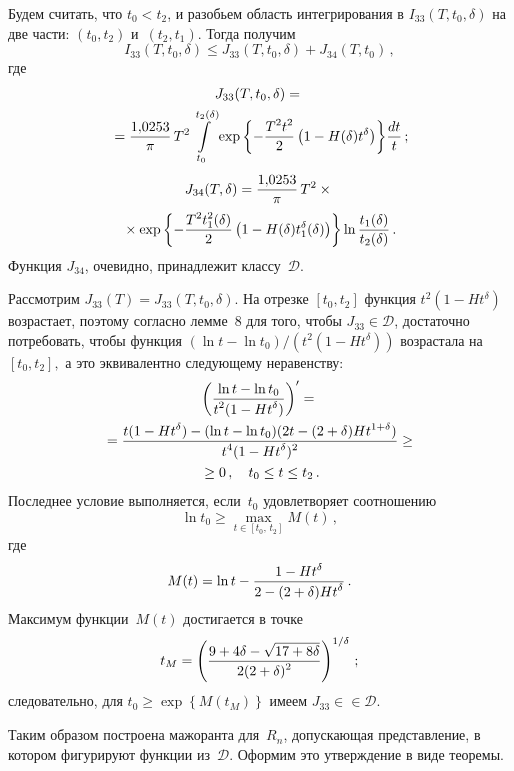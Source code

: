\begin{multicols}{2}
Будем считать, что $t_0<t_2$, и разобьем область интегрирования в
$I_{33}(T,t_0,\delta)$ на две части: $(t_0,t_2)$ и~$(t_2,t_1)$. Тогда
получим
$$
I_{33}(T,t_0,\delta)\le J_{33}(T,t_0,\delta)+J_{34}(T,t_0)\,,
$$
где
\begin{multline*}
J_{33}(T,t_0,\delta)={}\\
{}=
 \displaystyle\frac{\displaystyle 1{,}0253\mathstrut}{\displaystyle \pi\mathstrut}\,T^2\int\limits_{t_0}^{t_2(\delta)}
{\exp\left\{-\displaystyle\frac{\displaystyle T^2t^2\mathstrut}{\displaystyle 2\mathstrut}\left(1-H(\delta)t^{\delta}\right)\right\}}
\displaystyle\frac{\displaystyle dt\mathstrut}{\displaystyle t\mathstrut}\,;
\end{multline*}
\begin{multline*}
J_{34}(T,\delta)= \displaystyle\frac{\displaystyle 1{,}0253\mathstrut}{\displaystyle \pi\mathstrut}\,T^2\times{}\\
{}\times
\exp\left\{-\displaystyle\frac{\displaystyle T^2t_1^2(\delta)\mathstrut}{\displaystyle 2\mathstrut}\left(1-H(\delta)t_1^{\delta}(\delta)\right)
\right\} \ln\displaystyle\frac{\displaystyle t_1(\delta)\mathstrut}{\displaystyle t_2(\delta)\mathstrut}\,.
\end{multline*}
Функция $J_{34}$, очевидно, принадлежит классу~$\mathcal D$.
\pagebreak

Рассмотрим $J_{33}(T)=J_{33}(T,t_0,\delta)$. На отрезке $[t_0,t_2]$
функция $t^2(1-Ht^{\delta})$ возрастает, поэтому согласно
лемме~8 для того, чтобы $J_{33}\in \mathcal D$,
достаточно потребовать, чтобы функция
$\left(\ln t-\ln t_0\right)\!/\!\left(t^2(1-Ht^{\delta})\right)$
возрастала на $[t_0,t_2],$ а это эквивалентно следующему
неравенству:
\begin{multline*}
\left(\displaystyle\frac{\displaystyle \ln t-\ln t_0\mathstrut}{\displaystyle t^2(1-Ht^{\delta})\mathstrut}\right)'={}\\
{}=
\displaystyle\frac{\displaystyle t(1-Ht^{\delta})-(\ln t-\ln
t_0)(2t-(2+\delta)Ht^{1+\delta})\mathstrut}{\displaystyle t^4(1-Ht^{\delta})^2\mathstrut}\ge{}\\
{}\ge 0\,,\quad t_0\le t\le
t_2\,.
\end{multline*}
Последнее условие выполняется, если~$t_0$ удовлетворяет соотношению
$$
\ln t_0\ge \max\limits_{t\in[t_0,\,t_2]}M(t)\,,
$$
где
$$
M(t)=\ln t-\displaystyle\frac{\displaystyle 1-Ht^{\delta}\mathstrut}{\displaystyle 2-(2+\delta)Ht^{\delta}\mathstrut}\,.
$$
Максимум функции~$M(t)$ достигается в точке
$$
t_M=\left(\displaystyle\frac{\displaystyle 9+4\delta -\sqrt{17+8\delta}\mathstrut}{\displaystyle 2(2+\delta)^2\mathstrut}\right)^{1/\delta}\,;
$$
следовательно, для $t_0\ge \exp\left\{M(t_M)\right\}$ имеем
$J_{33}\in$\linebreak $\in \mathcal D$.

Таким образом построена мажоранта для~$R_n$, допускающая
представление, в котором фигурируют функции из~$\mathcal D$. Оформим
это утверждение в виде теоремы.

\smallskip


\end{multicols}
